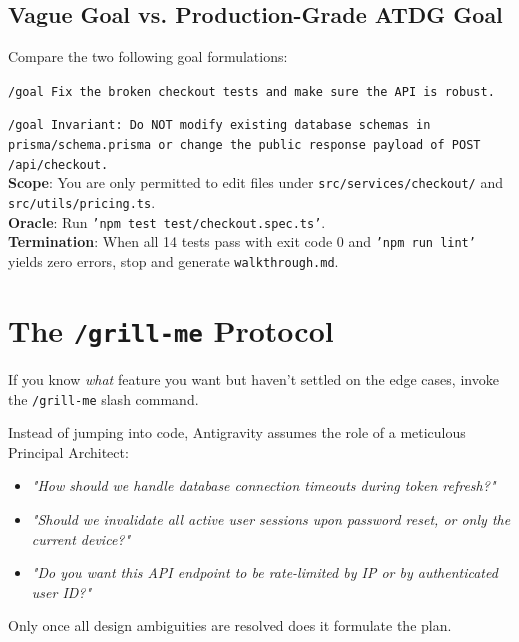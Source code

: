\documentclass[11pt,a4paper,oneside]{book}
\begin{document}
\subsection{Vague Goal vs. Production-Grade ATDG Goal}
Compare the two following goal formulations:

\begin{promptbox}
\texttt{/goal Fix the broken checkout tests and make sure the API is robust.}
\end{promptbox}

\begin{promptbox}
\texttt{/goal Invariant: Do NOT modify existing database schemas in prisma/schema.prisma or change the public response payload of POST /api/checkout.}\\
\textbf{Scope}: You are only permitted to edit files under \texttt{src/services/checkout/} and \texttt{src/utils/pricing.ts}.\\
\textbf{Oracle}: Run \texttt{'npm test test/checkout.spec.ts'}.\\
\textbf{Termination}: When all 14 tests pass with exit code 0 and \texttt{'npm run lint'} yields zero errors, stop and generate \texttt{walkthrough.md}.
\end{promptbox}

\section{The \texttt{/grill-me} Protocol}
If you know \textit{what} feature you want but haven't settled on the edge cases, invoke the \texttt{/grill-me} slash command. 

Instead of jumping into code, Antigravity assumes the role of a meticulous Principal Architect:
\begin{itemize}
    \item \textit{"How should we handle database connection timeouts during token refresh?"}
    \item \textit{"Should we invalidate all active user sessions upon password reset, or only the current device?"}
    \item \textit{"Do you want this API endpoint to be rate-limited by IP or by authenticated user ID?"}
\end{itemize}
Only once all design ambiguities are resolved does it formulate the plan.
\end{document}
